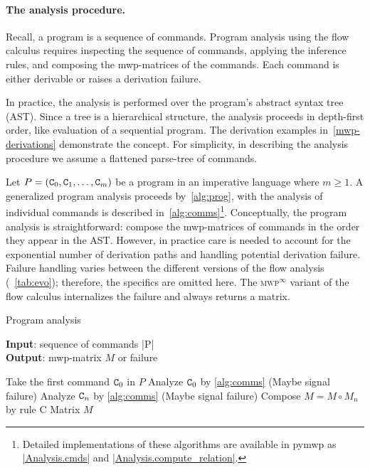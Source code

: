 \paragraph*{The analysis procedure.}
Recall, a program is a sequence of commands.
Program analysis using the flow calculus requires inspecting the sequence of commands,
applying the inference rules, and composing the mwp-matrices of the commands.
Each command is either derivable or raises a derivation failure.

In practice, the analysis is performed over the program's abstract syntax tree (AST).
Since a tree is a hierarchical structure, the analysis proceeds in depth-first order, like evaluation of a sequential program.
The derivation examples in~\autoref{mwp-derivations} demonstrate the concept.
For simplicity, in describing the analysis procedure we assume a flattened parse-tree of commands.

Let \(P = (\prm{C}_0,\prm{C}_1,\ldots,\prm{C}_m) \) be a program in an imperative language where \(m \geq 1\).
A generalized program analysis proceeds by~\autoref{alg:prog}, with the analysis of individual commands is described in~\autoref{alg:comms}\footnote{
    Detailed implementations of these algorithms are available in pymwp as
    \href{https://github.com/statycc/pymwp/blob/40c9ceb644c734f15f82e63edc515716c4f35841/pymwp/analysis.py\#L118}
    {\pr|Analysis.cmds|} and
    \href{https://github.com/statycc/pymwp/blob/40c9ceb644c734f15f82e63edc515716c4f35841/pymwp/analysis.py\#L185}{\pr|Analysis.compute\_relation|}.}.
Conceptually, the program analysis is straightforward: compose the mwp-matrices of commands in the order they appear in the AST\@.
However, in practice care is needed to account for the exponential number of derivation paths
and handling potential derivation failure.
Failure handling varies between the different versions of the flow analysis (\cf~\autoref{tab:evo});
therefore, the specifics are omitted here.
The \textsc{mwp}\(^\infty\) variant of the flow calculus internalizes the failure and always returns a matrix.

\begin{algorithm}
\caption{Program analysis}\label{alg:prog}
\textbf{Input}: sequence of commands \pr|P| \\
\textbf{Output}: mwp-matrix \(M\) or failure
\begin{algorithmic}[1]
\State Take the first command \(\prm{C}_0\) in \(P\)
\State Analyze \(\prm{C}_0\) by \autoref{alg:comms}
\State (Maybe signal failure)
\State Analyze \(\prm{C}_n\) by \autoref{alg:comms}
\State (Maybe signal failure)
\State Compose \(M = M \circ M_n \) by rule C
\EndFor
\State \Return Matrix \(M\) 
\end{algorithmic}
\end{algorithm}

